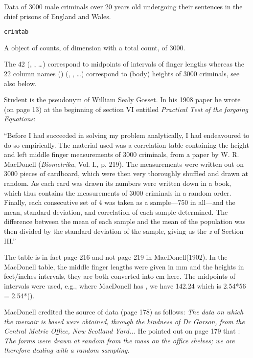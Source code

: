 %
\begin{Description}\relax
Data of 3000 male criminals over 20 years old undergoing their
sentences in the chief prisons of England and Wales.
\end{Description}
%
\begin{Usage}
\begin{verbatim}
crimtab
\end{verbatim}
\end{Usage}
%
\begin{Format}
A  object of   counts, of dimension
 with a total count,  of
3000.

The 42  (, , \dots)
correspond to midpoints of intervals of finger lengths
whereas the 22 column names ()
(, , \dots) correspond to (body) heights
of 3000 criminals, see also below.
\end{Format}
%
\begin{Details}\relax
Student is the pseudonym of William Sealy Gosset.
In his 1908 paper he wrote (on page 13) at the beginning of section VI
entitled \emph{Practical Test of the forgoing Equations}:

``Before I had succeeded in solving my problem analytically,
I had endeavoured to do so empirically.  The material used was a
correlation table containing the height and left middle finger
measurements of 3000 criminals, from a paper by W. R. MacDonell
(\emph{Biometrika}, Vol. I., p. 219).  The measurements were written
out on 3000 pieces of cardboard, which were then very thoroughly
shuffled and drawn at random.  As each card was drawn its numbers
were written down in a book, which thus contains the measurements of
3000 criminals in a random order.  Finally, each consecutive set of
4 was taken as a sample---750 in all---and the mean, standard
deviation, and correlation of each sample determined.  The
difference between the mean of each sample and the mean of the
population was then divided by the standard deviation of the sample,
giving us the \emph{z} of Section III.''

The table is in fact page 216 and not page 219 in MacDonell(1902).
In the MacDonell table, the middle finger lengths were given in mm
and the heights in feet/inches intervals, they are both converted into
cm here.  The midpoints of intervals were used, e.g., where MacDonell
has , we have 142.24 which is 2.54*56 =
2.54*().

MacDonell credited the source of data (page 178) as follows:
\emph{The data on which the memoir is based were obtained, through the
kindness of Dr Garson, from the Central Metric Office, New Scotland Yard...}
He pointed out on page 179 that : \emph{The forms were drawn at random
from the mass on the office shelves; we are therefore dealing with a
random sampling.}
\end{Details}
